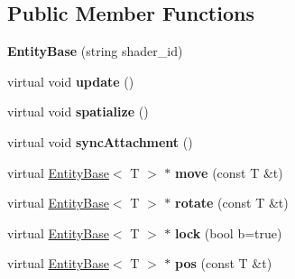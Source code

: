 \subsection*{Public Member Functions}
\begin{DoxyCompactItemize}
\item 
\hypertarget{classj3d_1_1base_1_1EntityBase_a306d0595cbccf6b497f39663e7bbf67d}{}{\bfseries Entity\+Base} (string shader\+\_\+id)\label{classj3d_1_1base_1_1EntityBase_a306d0595cbccf6b497f39663e7bbf67d}

\item 
\hypertarget{classj3d_1_1base_1_1EntityBase_a11ef641982250f6816b7c8276ec1e498}{}virtual void {\bfseries update} ()\label{classj3d_1_1base_1_1EntityBase_a11ef641982250f6816b7c8276ec1e498}

\item 
\hypertarget{classj3d_1_1base_1_1EntityBase_abfb3b9a7b986ffa5fef9429c71d7f653}{}virtual void {\bfseries spatialize} ()\label{classj3d_1_1base_1_1EntityBase_abfb3b9a7b986ffa5fef9429c71d7f653}

\item 
\hypertarget{classj3d_1_1base_1_1EntityBase_aaee6e91a90fa2099fbb30ee0817043a0}{}virtual void {\bfseries sync\+Attachment} ()\label{classj3d_1_1base_1_1EntityBase_aaee6e91a90fa2099fbb30ee0817043a0}

\item 
\hypertarget{classj3d_1_1base_1_1EntityBase_a1e109456587ef8dc4730ebdc2cb382c0}{}virtual \hyperlink{classj3d_1_1base_1_1EntityBase}{Entity\+Base}$<$ T $>$ $\ast$ {\bfseries move} (const T \&t)\label{classj3d_1_1base_1_1EntityBase_a1e109456587ef8dc4730ebdc2cb382c0}

\item 
\hypertarget{classj3d_1_1base_1_1EntityBase_a1735e8350927e7c4212dea37998433ee}{}virtual \hyperlink{classj3d_1_1base_1_1EntityBase}{Entity\+Base}$<$ T $>$ $\ast$ {\bfseries rotate} (const T \&t)\label{classj3d_1_1base_1_1EntityBase_a1735e8350927e7c4212dea37998433ee}

\item 
\hypertarget{classj3d_1_1base_1_1EntityBase_ae6fd806e59400c62c6e2bd17e8827ab6}{}virtual \hyperlink{classj3d_1_1base_1_1EntityBase}{Entity\+Base}$<$ T $>$ $\ast$ {\bfseries lock} (bool b=true)\label{classj3d_1_1base_1_1EntityBase_ae6fd806e59400c62c6e2bd17e8827ab6}

\item 
\hypertarget{classj3d_1_1base_1_1EntityBase_aa3c03efb213e8afceaba808463926bea}{}virtual \hyperlink{classj3d_1_1base_1_1EntityBase}{Entity\+Base}$<$ T $>$ $\ast$ {\bfseries pos} (const T \&t)\label{classj3d_1_1base_1_1EntityBase_aa3c03efb213e8afceaba808463926bea}


\end{DoxyCompactItemize}

